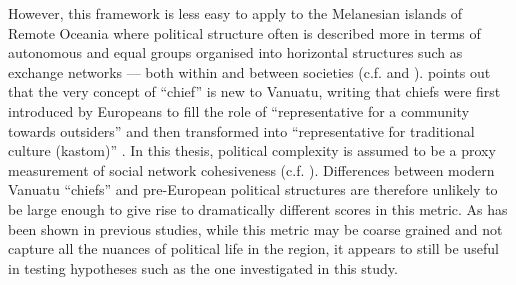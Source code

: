 \documentclass[a4paper,10pt]{article} %
\begin{document}
However, this framework is less easy to apply to the Melanesian islands of Remote Oceania where political structure often is described more in terms of autonomous and equal groups organised into horizontal structures such as exchange networks --- both within and between societies (c.f. \citet{bonnemaison1996graded} and \citet{huffman1996trading}). \citet{bolton1998chief} points out that the very concept of ``chief'' is new to Vanuatu, writing that chiefs were first introduced by Europeans to fill the role of ``representative for a community towards outsiders'' and then transformed into ``representative for traditional culture (kastom)'' \citep[185]{bolton1998chief}. In this thesis, political complexity is assumed to be a proxy measurement of social network cohesiveness (c.f. \citet{grace_1992_aberrant}). Differences between modern Vanuatu ``chiefs'' and pre-European political structures are therefore unlikely to be large enough to give rise to dramatically different scores in this metric. As has been shown in previous studies, while this metric may be coarse grained and not capture all the nuances of political life in the region, it appears to still be useful in testing hypotheses such as the one investigated in this study.



\end{document}
